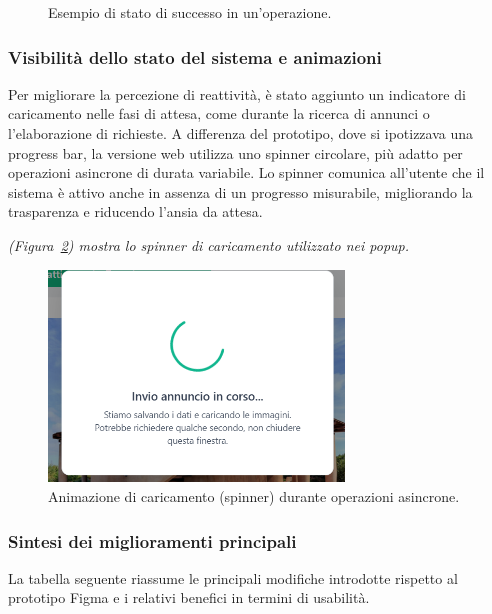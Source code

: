 \begin{figure}[H]
\begin{minipage}[t]{0.48\textwidth}
    \caption{Esempio di stato di successo in un’operazione.}
    \label{fig:popup-success}
\end{minipage}
\end{figure}

\subsubsection*{Visibilità dello stato del sistema e animazioni}
Per migliorare la percezione di reattività, è stato aggiunto un indicatore di caricamento nelle fasi di attesa, come durante la ricerca di annunci o l’elaborazione di richieste.
A differenza del prototipo, dove si ipotizzava una progress bar, la versione web utilizza uno spinner circolare, più adatto per operazioni asincrone di durata variabile.
Lo spinner comunica all’utente che il sistema è attivo anche in assenza di un progresso misurabile, migliorando la trasparenza e riducendo l’ansia da attesa.

\vspace{4pt}
\textit{(Figura~\ref{fig:popup-loading}) mostra lo spinner di caricamento utilizzato nei popup.}

\begin{figure}[H]
\centering
\includegraphics[width=0.7\textwidth]{Immagini/Expert Reviews/Sito/CreazioneAnnuncioCaricamento.png}
\caption{Animazione di caricamento (spinner) durante operazioni asincrone.}
\label{fig:popup-loading}
\end{figure}

\subsubsection*{Sintesi dei miglioramenti principali}
La tabella seguente riassume le principali modifiche introdotte rispetto al prototipo Figma e i relativi benefici in termini di usabilità.

